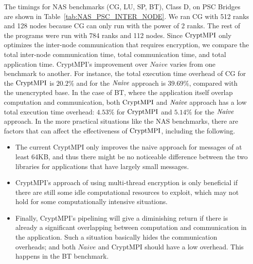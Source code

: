 
{
The timings for NAS benchmarks (CG, LU, SP, BT), Class D,
on PSC Bridges are shown in Table~\ref{tab:NAS_PSC_INTER_NODE}.
We ran CG with 512 ranks and 128 nodes because CG can only run with the power of 2 ranks.
The rest of the programs were run with 784 ranks and 112 nodes. 
Since $\textrm{CryptMPI}$ only optimizes the inter-node communication that requires encryption,
we compare the total inter-node communication time, total communication time, and total
application time. CryptMPI's improvement over $Naive$ varies from one benchmark to another.
For instance, the total execution time
overhead of CG for the $\textrm{CryptMPI}$ is $20.2\%$ and for the ${\emph{Naive}}$ approach is $39.69\%$,
compared with the unencrypted base. In the case of BT, where the application itself overlap
computation and communication, both $\textrm{CryptMPI}$ and ${\emph{Naive}}$ approach
has a low total execution time overhead: $4.53\%$ for $\textrm{CryptMPI}$ and $5.14\%$ for the ${\emph{Naive}}$
approach. In the more practical situations like
the NAS benchmarks, there are factors that can affect the effectiveness
of $\textrm{CryptMPI}$, including the following.

\begin{itemize}
\item The current CryptMPI only improves the naive approach
  for messages of at least 64KB, and thus there might be no noticeable
    difference between the two libraries
    for applications that have largely small messages.

\item CryptMPI's approach of using multi-thread encryption is only
  beneficial if there are still some idle computational resources to
    exploit, which may not hold for some computationally intensive situations.

\item Finally, CryptMPI's pipelining will give a diminishing return if
  there is already a significant overlapping between computation and
    communication in the application. Such a situation basically hides
    the communication overheads; and both $Naive$ and CryptMPI should have
    a low overhead. This happens in the BT benchmark.
\end{itemize}

}
